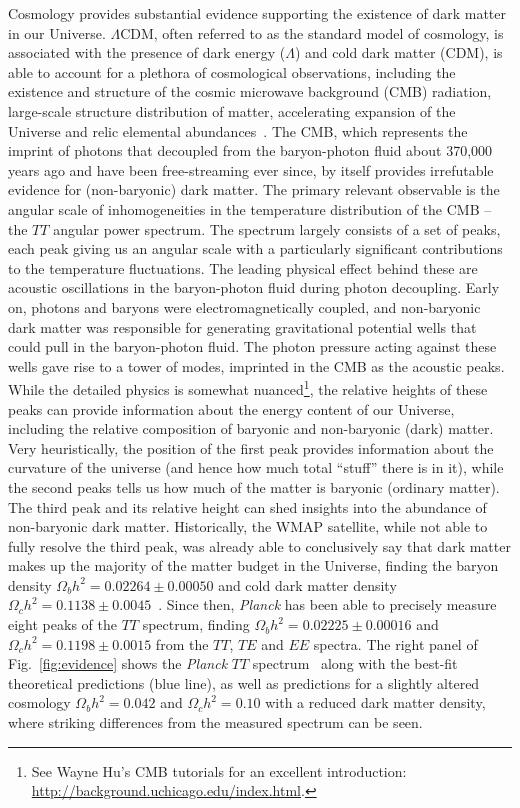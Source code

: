 Cosmology provides substantial evidence supporting the existence of dark matter in our Universe. $\Lambda$CDM, often referred to as the standard model of cosmology, is associated with the presence of dark energy ($\Lambda$) and cold dark matter (CDM), is able to account for a plethora of cosmological observations, including the existence and structure of the cosmic microwave background (CMB) radiation, large-scale structure distribution of matter, accelerating expansion of the Universe and relic elemental abundances~\cite{Dodelson:1282338,Kolb:1990vq}. The CMB, which represents the imprint of photons that decoupled from the baryon-photon fluid about 370,000 years ago and have been free-streaming ever since, by itself provides irrefutable evidence for (non-baryonic) dark matter. The primary relevant observable is the angular scale of inhomogeneities in the temperature distribution of the CMB -- the $TT$ angular power spectrum. The spectrum largely consists of a set of peaks, each peak giving us an angular scale with a particularly significant contributions to the temperature fluctuations. The leading physical effect behind these are acoustic oscillations in the baryon-photon fluid during photon decoupling. Early on, photons and baryons were electromagnetically coupled, and non-baryonic dark matter was responsible for generating gravitational potential wells that could pull in the baryon-photon fluid. The photon pressure acting against these wells gave rise to a tower of modes, imprinted in the CMB as the acoustic peaks. While the detailed physics is somewhat nuanced\footnote{See Wayne Hu's CMB tutorials for an excellent introduction: \url{http://background.uchicago.edu/index.html}.}, the relative heights of these peaks can provide information about the energy content of our Universe, including the relative composition of baryonic and non-baryonic (dark) matter. Very heuristically, the position of the first peak provides information about the curvature of the universe (and hence how much total ``stuff'' there is in it), while the second peaks tells us how much of the matter is baryonic (ordinary matter). The third peak and its relative height can shed insights into the abundance of non-baryonic dark matter. Historically, the WMAP satellite, while not able to fully resolve the third peak, was already able to conclusively say that dark matter makes up the majority of the matter budget in the Universe, finding the baryon density $\Omega_b h^2=0.02264\pm0.00050$ and cold dark matter density $\Omega_c h^2=0.1138\pm0.0045$~\cite{2013ApJS..208...19H}. Since then, \emph{Planck} has been able to precisely measure eight peaks of the $TT$ spectrum, finding $\Omega_b h^2= 0.02225\pm0.00016$ and $\Omega_c h^2=0.1198\pm0.0015$ from the $TT$, $TE$ and $EE$ spectra. The right panel of Fig.~\ref{fig:evidence} shows the \emph{Planck} $TT$ spectrum~\cite{Ade:2015xua} along with the best-fit theoretical predictions (blue line), as well as predictions for a slightly altered cosmology $\Omega_b h^2= 0.042$ and $\Omega_c h^2=0.10$ with a reduced dark matter density, where striking differences from the measured spectrum can be seen.

